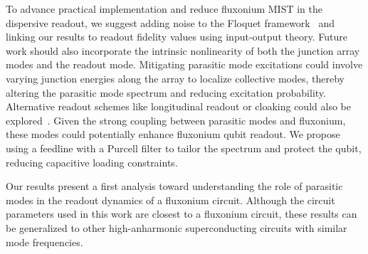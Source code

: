 \documentclass[prx,showpacs,notitlepage,twocolumn,superscriptaddress,nofootinbib,preprintnumbers,floatfix]{revtex4-2}
\newcommand{\sh}[1]{{\color{orange}{{}[SS: #1]}}}%
\begin{document}

To advance practical implementation and reduce fluxonium MIST in the dispersive readout, we suggest adding noise to the Floquet framework~\cite{huang_engineering_2021} and linking our results to readout fidelity values using input-output theory. Future work should also incorporate the intrinsic nonlinearity of both the junction array modes and the readout mode. Mitigating parasitic mode excitations could involve varying junction energies along the array to localize collective modes, thereby altering the parasitic mode spectrum and reducing excitation probability. Alternative readout schemes like longitudinal readout or cloaking could also be explored~\cite{reed_high-fidelity_2010, munoz-arias_qubit_2023, didier_fast_2015}. Given the strong coupling between parasitic modes and fluxonium, these modes could potentially enhance fluxonium qubit readout. We propose using a feedline with a Purcell filter to tailor the spectrum and protect the qubit, reducing capacitive loading constraints.


Our results present a first analysis toward understanding the role of parasitic modes in the readout dynamics of a fluxonium circuit. Although the circuit parameters used in this work are closest to a fluxonium circuit, these results can be generalized to other high-anharmonic superconducting circuits with similar mode frequencies.
\end{document}
